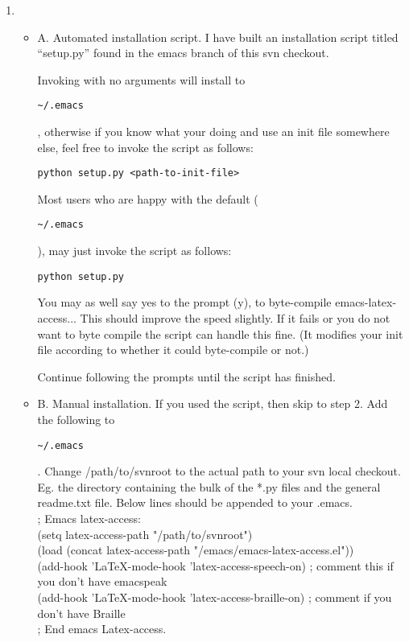 \documentclass[12pt,a4paper]{report}
\begin{document}
\begin{enumerate}
\item
\begin{itemize}
  \item A. Automated installation script.
  I have built an installation script titled ``setup.py'' found in the emacs
branch of this svn checkout.

Invoking with no arguments will install to
\begin{verbatim}
~/.emacs
\end{verbatim}, otherwise if you know
what your doing and use an init file somewhere else, feel free to invoke
the script as follows:
\begin{verbatim}
python setup.py <path-to-init-file>
\end{verbatim}

Most users who are happy with the default (
\begin{verbatim}
~/.emacs
\end{verbatim}
), may just invoke
the script as follows:
\begin{verbatim}
python setup.py
\end{verbatim}

You may as well say yes to the prompt (y), to byte-compile
emacs-latex-access... This should improve the speed slightly. If it
fails or you do not want to byte compile the script can handle this
fine. (It modifies your init file according to whether it could
byte-compile or not.)

Continue following the prompts until the script has finished.
\item B. Manual installation. If you used the script, then skip to step
  2.
  Add the following to
  \begin{verbatim}
~/.emacs
\end{verbatim}. Change /path/to/svnroot to the actual
path to your svn local checkout. Eg. the directory containing the bulk
of the *.py files and the general readme.txt file.
Below lines should be appended to your .emacs.\\

; Emacs latex-access:\\
(setq latex-access-path "/path/to/svnroot")\\
(load (concat latex-access-path "/emacs/emacs-latex-access.el"))\\
(add-hook 'LaTeX-mode-hook 'latex-access-speech-on) ; comment this if you don't have emacspeak\\
(add-hook 'LaTeX-mode-hook 'latex-access-braille-on) ; comment if you don't have Braille \\
; End emacs Latex-access.\\


\end{itemize}
\end{enumerate}
\end{document}

